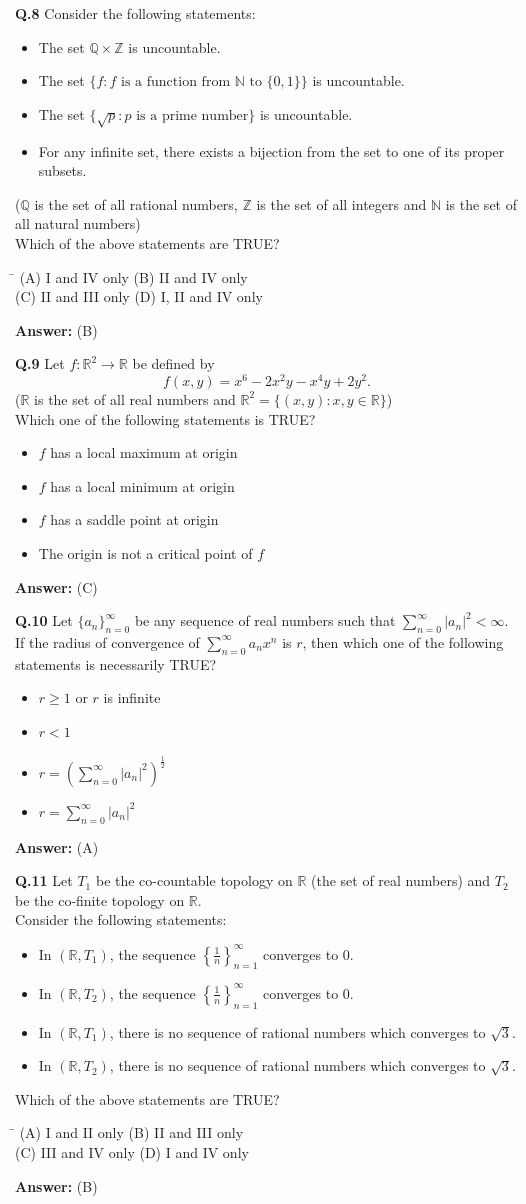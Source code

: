 \documentclass[11pt,a4paper]{article}
\newcommand{\optsfourA}[4]{%
  \begin{tabbing}
    \hspace{0.48\linewidth}\=\kill
    (A) #1 \> (B) #2 \\[2pt]
    (C) #3 \> (D) #4
  \end{tabbing}%
}
\newcommand{\optslistA}[4]{%
  \begin{itemize}
    \setlength{\itemsep}{2pt}\setlength{\parskip}{0pt}
    \item[(A)] #1
    \item[(B)] #2
    \item[(C)] #3
    \item[(D)] #4
  \end{itemize}%
}
\newcommand{\ans}[1]{\textbf{Answer:} #1\par\medskip}
\begin{document}
\textbf{Q.8} Consider the following statements:
\begin{itemize}
  \setlength{\itemsep}{1pt}\setlength{\parskip}{0pt}
  \item[I.] The set $\mathbb{Q} \times \mathbb{Z}$ is uncountable.
  \item[II.] The set $\{f : f \text{ is a function from } \mathbb{N} \text{ to } \{0, 1\}\}$ is uncountable.
  \item[III.] The set $\{\sqrt{p} : p \text{ is a prime number}\}$ is uncountable.
  \item[IV.] For any infinite set, there exists a bijection from the set to one of its proper subsets.
\end{itemize}
($\mathbb{Q}$ is the set of all rational numbers, $\mathbb{Z}$ is the set of all integers and $\mathbb{N}$ is the set of all natural numbers)\\
Which of the above statements are TRUE?
\optsfourA{I and IV only}{II and IV only}{II and III only}{I, II and IV only}
\ans{(B)}

\textbf{Q.9} Let $f : \mathbb{R}^2 \to \mathbb{R}$ be defined by
\[
  f(x, y) = x^6 - 2x^2 y - x^4 y + 2y^2.
\]
($\mathbb{R}$ is the set of all real numbers and $\mathbb{R}^2 = \{(x, y) : x, y \in \mathbb{R}\}$)\\
Which one of the following statements is TRUE?
\optslistA{$f$ has a local maximum at origin}{$f$ has a local minimum at origin}{$f$ has a saddle point at origin}{The origin is not a critical point of $f$}
\ans{(C)}

\textbf{Q.10} Let $\{a_n\}_{n=0}^{\infty}$ be any sequence of real numbers such that $\displaystyle\sum_{n=0}^{\infty} |a_n|^2 < \infty$. If the radius of convergence of $\displaystyle\sum_{n=0}^{\infty} a_n x^n$ is $r$, then which one of the following statements is necessarily TRUE?
\optslistA{$r \ge 1$ or $r$ is infinite}{$r < 1$}{$r = \left(\displaystyle\sum_{n=0}^{\infty} |a_n|^2\right)^{\frac{1}{2}}$}{$r = \displaystyle\sum_{n=0}^{\infty} |a_n|^2$}
\ans{(A)}

\textbf{Q.11} Let $T_1$ be the co-countable topology on $\mathbb{R}$ (the set of real numbers) and $T_2$ be the co-finite topology on $\mathbb{R}$.\\
Consider the following statements:
\begin{itemize}
  \setlength{\itemsep}{1pt}\setlength{\parskip}{0pt}
  \item[I.] In $(\mathbb{R}, T_1)$, the sequence $\left\{\frac{1}{n}\right\}_{n=1}^{\infty}$ converges to $0$.
  \item[II.] In $(\mathbb{R}, T_2)$, the sequence $\left\{\frac{1}{n}\right\}_{n=1}^{\infty}$ converges to $0$.
  \item[III.] In $(\mathbb{R}, T_1)$, there is no sequence of rational numbers which converges to $\sqrt{3}$.
  \item[IV.] In $(\mathbb{R}, T_2)$, there is no sequence of rational numbers which converges to $\sqrt{3}$.
\end{itemize}
Which of the above statements are TRUE?
\optsfourA{I and II only}{II and III only}{III and IV only}{I and IV only}
\ans{(B)}
\end{document}
